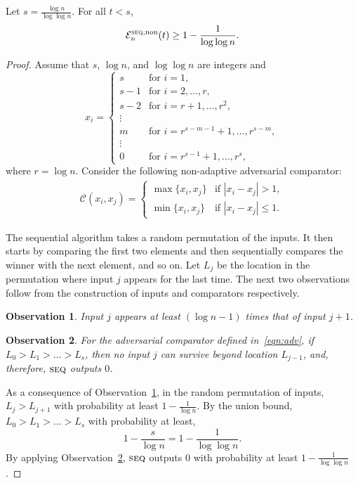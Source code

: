 \documentclass[twoside,11pt]{article}
\newtheorem{obs}{\textbf{Observation}}
\newcommand{\cC}{\mathcal{C}}
\newcommand{\cE}{\mathcal{E}}
\newcommand{\algorithms}[1]{\textsc{#1}}
\newcommand{\algseq}{\algorithms{seq}}
\newcommand{\pe}{\cE}
\newcommand{\nonadaptive}{\textnormal{non}}
\begin{document}
\begin{lemma}
\label{lem:sequential_example}
 Let $s=\frac{\log n}{\log\log n}$. For all $t<s$,
 $$\pe_n^{\algseq,\nonadaptive}(t)\ge 1-\frac{1}{\log \log n}.$$
\end{lemma}
\begin{proof}
Assume that $s$, $\log n$, and $\log\log n$ are integers and
\[
x_i=\left\{
 \begin{array}{ll}
  s & \text{for }i=1,\\
  s-1 &\text{for } i=2,\ldots,r,\\
  s-2 &\text{for } i=r+1,\ldots,r^2,\\
  \vdots\\
  m & \text{for } i=r^{s-m-1}+1,\ldots,r^{s-m},\\
  \vdots\\
  0 & \text{for } i=r^{s-1}+1,\ldots,r^s,
 \end{array}\right.
\]
where $r=\log n$.
Consider the following non-adaptive adversarial comparator:
\begin{align}\label{eqn:adv}
\cC(x_i,x_j) = \left\{
\begin{array}{ll}
\max\{x_i,x_j\} & \text{if } |x_i-x_j|>1,\\
\min\{x_i,x_j\} & \text{if }  |x_i-x_j|\le 1.
\end{array} \right.
\end{align}

The sequential algorithm takes a random permutation of the inputs. It
then starts by comparing the first two elements and then sequentially
compares the winner with the next element, and so on. Let $L_j$ be the
location in the permutation where input $j$ appears for the last time.
The next two observations follow from the construction of inputs and
comparators respectively.
\begin{obs}
\label{obs:thenumber}
Input $j$ appears at least $(\log n-1)$ times that of input $j+1$.
\end{obs}
\begin{obs}
 \label{obs:forthe}
 For the adversarial comparator defined in~\eqref{eqn:adv}, if
 $L_0>L_1>\ldots>L_s$, then no input $j$ can survive beyond location
 $L_{j-1}$, and, therefore, $\algseq$ outputs $0$.
\end{obs}

As a consequence of Observation~\ref{obs:thenumber}, in the random permutation of inputs, $L_j>L_{j+1}$ with probability at least $1-\frac1{\log n}$. By the union bound, $L_0>L_1>\ldots>L_s$ with probability at least,
\[
1-\frac{s}{\log n}=1-\frac1{\log \log n}.
\]
By applying Observation~\ref{obs:forthe}, $\algseq$ outputs $0$ with probability at least $1-\frac1{\log \log n}$.
\end{proof}
\end{document}
